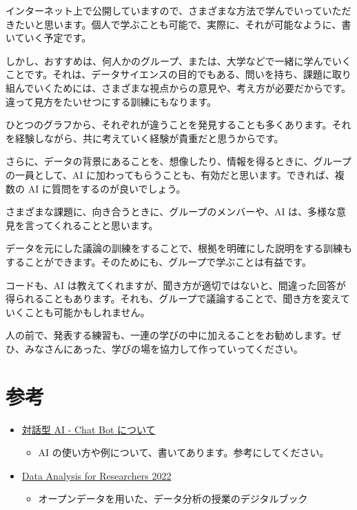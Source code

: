 \documentclass[
  xelatex, ja=standard]{bxjsbook}
\providecommand{\tightlist}{%
  \setlength{\itemsep}{0pt}\setlength{\parskip}{0pt}}
\theoremstyle{definition}
\theoremstyle{definition}
\theoremstyle{definition}
\theoremstyle{definition}
\theoremstyle{remark}
\begin{document}
インターネット上で公開していますので、さまざまな方法で学んでいっていただきたいと思います。個人で学ぶことも可能で、実際に、それが可能なように、書いていく予定です。

しかし、おすすめは、何人かのグループ、または、大学などで一緒に学んでいくことです。それは、データサイエンスの目的でもある、問いを持ち、課題に取り組んでいくためには、さまざまな視点からの意見や、考え方が必要だからです。違って見方をたいせつにする訓練にもなります。

ひとつのグラフから、それぞれが違うことを発見することも多くあります。それを経験しながら、共に考えていく経験が貴重だと思うからです。

さらに、データの背景にあることを、想像したり、情報を得るときに、グループの一員として、AI に加わってもらうことも、有効だと思います。できれば、複数の AI に質問をするのが良いでしょう。

さまざまな課題に、向き合うときに、グループのメンバーや、AI は、多様な意見を言ってくれることと思います。

データを元にした議論の訓練をすることで、根拠を明確にした説明をする訓練もすることができます。そのためにも、グループで学ぶことは有益です。

コードも、AI は教えてくれますが、聞き方が適切ではないと、間違った回答が得られることもあります。それも、グループで議論することで、聞き方を変えていくことも可能かもしれません。

人の前で、発表する練習も、一連の学びの中に加えることをお勧めします。ぜひ、みなさんにあった、学びの場を協力して作っていってください。

\hypertarget{ux53c2ux8003-1}{%
\section{参考}\label{ux53c2ux8003-1}}

\begin{itemize}
\tightlist
\item
  \href{https://icu-hsuzuki.github.io/ds_education/chatgpt.html\#chatgpt}{対話型 AI - Chat Bot について}

  \begin{itemize}
  \tightlist
  \item
    AI の使い方や例について、書いてあります。参考にしてください。
  \end{itemize}
\item
  \href{https://icu-hsuzuki.github.io/da4r2022/}{Data Analysis for Researchers 2022}

  \begin{itemize}
  \tightlist
  \item
    オープンデータを用いた、データ分析の授業のデジタルブック
  \end{itemize}
\end{itemize}
\end{document}
